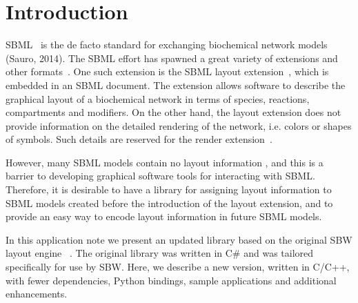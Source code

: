 \documentclass{bioinfo}
\begin{document}
\section{Introduction}


SBML~\citep{Hucka:2003fs} is the de facto standard for exchanging biochemical network models (Sauro, 2014). The SBML effort has  spawned a great variety of extensions and other formats~\citep{Drager2014}. One such extension is the SBML layout extension~\citep{Gauges2006}, which is embedded in an SBML document. The extension allows software to describe the graphical layout of a biochemical network in terms of species, reactions, compartments and modifiers. On the other hand, the layout extension does not provide information on the detailed rendering of the network, i.e. colors or shapes of symbols. Such details are reserved for the render extension~\citep{Gauges2009}. 

However, many SBML models contain no layout information \citep{BergmanSBW2006}, and this is a barrier to developing graphical software tools for interacting with SBML. Therefore, it is desirable to have a library for assigning layout information to SBML models created before the introduction of the layout extension, and to provide an easy way to encode layout information in future SBML models. 

In this application note we present an updated library based on the original SBW layout engine ~\citep{Deckard2006}. The original library was written in C\# and was tailored specifically for use by SBW.
Here, we describe a new version, written in C/C++, with fewer dependencies,
Python bindings, sample applications and additional enhancements. 
\end{document}
